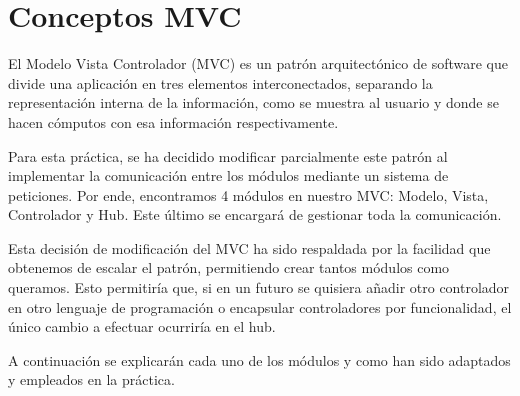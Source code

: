 \section{Conceptos MVC}

El Modelo Vista Controlador (MVC) es un patrón arquitectónico de software que divide una aplicación en tres elementos interconectados, separando la representación interna de la información, como se muestra al usuario y donde se hacen cómputos con esa información respectivamente. \bigskip

Para esta práctica, se ha decidido modificar parcialmente este patrón al implementar la comunicación entre los módulos mediante un sistema de peticiones. Por ende, encontramos 4 módulos en nuestro MVC: Modelo, Vista, Controlador y Hub. Este último se encargará de gestionar toda la comunicación. \bigskip

Esta decisión de modificación del MVC ha sido respaldada por la facilidad que obtenemos de escalar el patrón, permitiendo crear tantos módulos como queramos. Esto permitiría que, si en un futuro se quisiera añadir otro controlador en otro lenguaje de programación o encapsular controladores por funcionalidad, el único cambio a efectuar ocurriría en el hub.\bigskip


A continuación se explicarán cada uno de los módulos y como han sido adaptados y empleados en la práctica.





